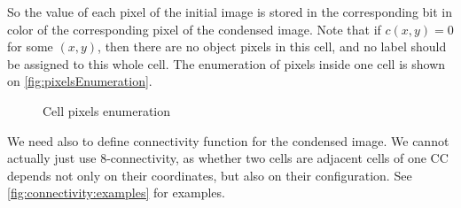 \documentclass[hidelinks]{llncs}
\newcommand{\texten}[1]{#1}
\newcommand{\textru}[1]{}
\begin{document}
\texten{
So the value of each pixel of the initial image is stored in the corresponding
bit in color of the corresponding pixel of the condensed image.
Note that if $c(x, y) = 0$ for some $(x, y)$, then there are no object pixels in
this cell, and no label should be assigned to this whole cell. The enumeration of
pixels inside one cell is shown on \autoref{fig:pixelsEnumeration}.
}\textru{
Таким образом значение каждого из исходных пикселей просто записано в соответствующий
бит в итоговом пикселе. Важно отметить, что если все четыре исходных пикселя были
фоновые, то и клетка будет иметь цвет 0. Нумерация пикселей внутри клетки показана на
\autoref{fig:pixelsEnumeration}.
}

\begin{figure}[t]
  \centering
  \caption{Cell pixels enumeration}
  \label{fig:pixelsEnumeration}
\end{figure}

\texten{
We need also to define connectivity function for the condensed image.
We cannot actually just use 8-connectivity, as whether two cells are adjacent
cells of one CC depends not only on their coordinates, but also on their
configuration. See \autoref{fig:connectivity:examples} for examples.
}\textru{
Ещё нужно дать определение связности для сжатого изображения. Мы уже не можем
использовать 8-связность: теперь нельзя сказать, связаны ли две клетки, не
проанализировав их цвета. Смотри \autoref{fig:connectivity:examples}.
}
\end{document}
